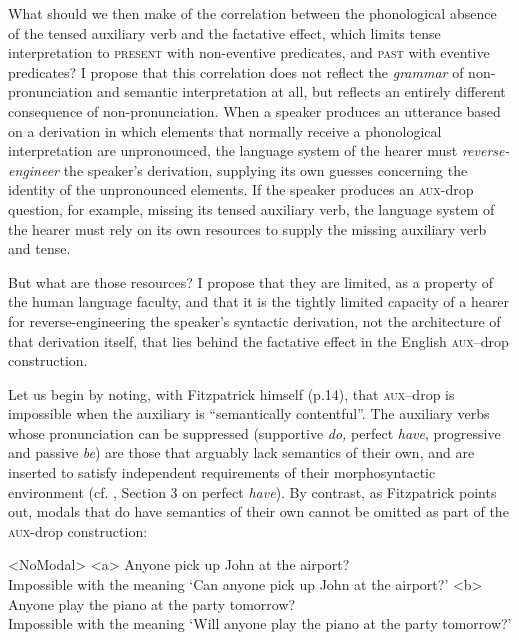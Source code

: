 \documentclass[output=paper]{langscibook}
\begin{document}
What should we then make of the correlation between the phonological absence of the tensed auxiliary verb and the factative effect, which limits tense interpretation to \textsc{present} with non-eventive predicates, and \textsc{past} with eventive predicates? I propose that this correlation does not reflect the \textit{grammar} of non-pronunciation and semantic interpretation at all, but reflects an entirely different consequence of non-pronunciation. When a speaker produces an utterance based on a derivation in which elements that normally receive a phonological interpretation are unpronounced, the language system of the hearer must\textit{ reverse-engineer }the speaker's derivation, supplying its own guesses concerning the identity of the unpronounced elements. If the speaker produces an \textsc{aux-}drop question, for example, missing its tensed auxiliary verb, the language system of the hearer must rely on its own resources to supply the missing auxiliary verb and tense. 

But what are those resources? I propose that they are limited, as a property of the human language faculty, and that it is the tightly limited capacity of a hearer for reverse-engineering the speaker's syntactic derivation, not the architecture of that derivation itself, that lies behind the factative effect in the English \textsc{aux}--drop construction. 

Let us begin by noting, with Fitzpatrick himself (p.14), that \textsc{aux}--drop is impossible when the auxiliary\textsc{ }is “semantically contentful”. The auxiliary verbs whose pronunciation can be suppressed (supportive \textit{do, }perfect \textit{have}, progressive and passive \textit{be}) are those that arguably lack semantics of their own, and are inserted to satisfy independent requirements of their morphosyntactic environment (cf. \citealt{GrOnn:2021aa}, Section 3 on perfect \textit{have}). By contrast, as Fitzpatrick points out, modals that do have semantics of their own cannot be omitted as part of the \textsc{aux-}drop construction:

\pex<NoModal>
\a<a> Anyone pick up John at the airport?\\
Impossible with the meaning `Can anyone pick up John at the airport?'
\a<b> Anyone play the piano at the party tomorrow?\\
Impossible with the meaning `Will anyone play the piano at the party tomorrow?'
\xe
\end{document}
